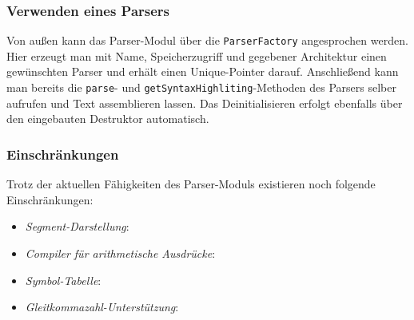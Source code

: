 \subsubsection{Verwenden eines Parsers}

Von außen kann das Parser-Modul über die \texttt{ParserFactory} angesprochen werden. Hier erzeugt man mit Name, Speicherzugriff und gegebener Architektur einen gewünschten Parser und erhält einen Unique-Pointer darauf. Anschließend kann man bereits die \texttt{parse}- und \texttt{getSyntaxHighliting}-Methoden des Parsers selber aufrufen und Text assemblieren lassen. Das Deinitialisieren erfolgt ebenfalls über den eingebauten Destruktor automatisch.

\subsubsection{Einschränkungen}

Trotz der aktuellen Fähigkeiten des Parser-Moduls existieren noch folgende Einschränkungen:

\begin{itemize}
\item \emph{Segment-Darstellung}: 
\item \emph{Compiler für arithmetische Ausdrücke}: 
\item \emph{Symbol-Tabelle}: 
\item \emph{Gleitkommazahl-Unterstützung}: 
\end{itemize}

